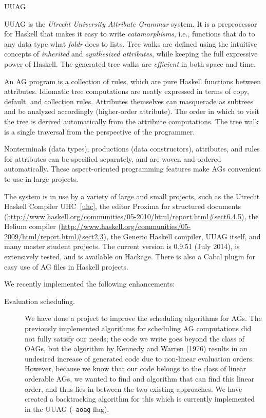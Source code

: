 \begin{hcarentry}[updated]{UUAG}
\label{uuag}
\makeheader

UUAG is the \emph{Utrecht University Attribute Grammar} system. It is a preprocessor for Haskell
that makes it easy to write \emph{catamorphisms}, i.e., functions that do to any data type what
\emph{foldr} does to lists. Tree walks are defined using the intuitive concepts of
\emph{inherited} and \emph{synthesized attributes}, while keeping the full expressive power
of Haskell. The generated tree walks are \emph{efficient} in both space and time.

An AG program is a collection of rules, which are pure Haskell functions between attributes.
Idiomatic tree computations are neatly expressed in terms of copy, default, and collection rules.
Attributes themselves can masquerade as subtrees and be analyzed accordingly (higher-order attribute).
The order in which to visit the tree is derived automatically from the attribute computations.
The tree walk is a single traversal from the perspective of the programmer.

Nonterminals (data types), productions (data constructors), attributes, and rules for attributes can
be specified separately, and are woven and ordered automatically. These aspect-oriented programming
features make AGs convenient to use in large projects.

The system is in use by a variety of large and small projects, such as the Utrecht Haskell Compiler
UHC~\cref{uhc}, the editor Proxima for structured documents (\url{http://www.haskell.org/communities/05-2010/html/report.html#sect6.4.5}),
the Helium compiler (\url{http://www.haskell.org/communities/05-2009/html/report.html#sect2.3}),
the Generic Haskell compiler, UUAG itself, and many master student projects.
The current version is 0.9.51 (July 2014), is extensively tested, and is available on Hackage.
There is also a Cabal plugin for easy use of AG files in Haskell projects.

We recently implemented the following enhancements:
\begin{description}
\item[Evaluation scheduling.]
  We have done a project to improve the scheduling algorithms for AGs. The previously implemented
  algorithms for scheduling AG computations did not fully satisfy our needs; the code we write goes
  beyond the class of OAGs, but the algorithm by Kennedy and Warren (1976) results in an undesired
  increase of generated code due to non-linear evaluation orders. However, because we know that our
  code belongs to the class of linear orderable AGs, we wanted to find and algorithm that can find
  this linear order, and thus lies in between the two existing approaches. We have created a backtracking
  algorithm for this which is currently implemented in the UUAG (\texttt{--aoag} flag).
  

\end{description}
\end{hcarentry}
